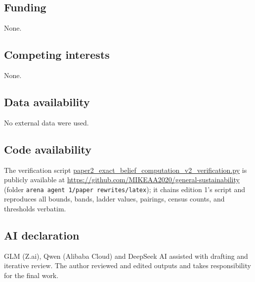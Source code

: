 \documentclass[10pt,twocolumn]{article}
\theoremstyle{plain}
\theoremstyle{definition}
\theoremstyle{remark}
\begin{document}
\subsection*{Funding}
None.

\subsection*{Competing interests}
None.

\subsection*{Data availability}
No external data were used.

\subsection*{Code availability}
The verification script
\url{paper2_exact_belief_computation_v2_verification.py} is publicly
available at \url{https://github.com/MIKEAA2020/general-sustainability}
(folder \texttt{arena agent 1/paper rewrites/latex}); it chains edition
1's script and reproduces all bounds, bands, ladder values, pairings,
census counts, and thresholds verbatim.

\subsection*{AI declaration}
GLM (Z.ai), Qwen (Alibaba Cloud) and DeepSeek AI assisted with drafting
and iterative review. The author reviewed and edited outputs and takes
responsibility for the final work.
\end{document}
